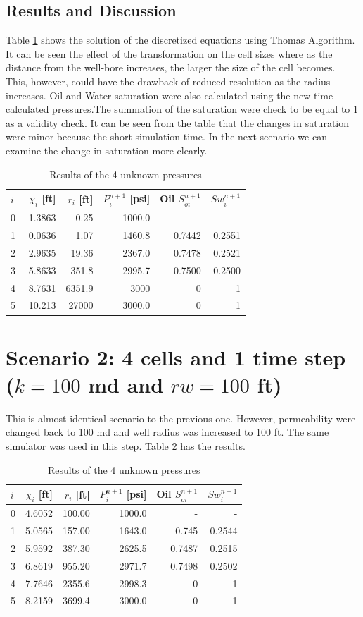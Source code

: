 \documentclass[12pt,letterpaper,titlepage]{article}
\begin{document}
\subsection{Results and Discussion}
Table \ref{tab:1} shows the solution of the discretized equations using Thomas Algorithm. It can be seen the effect of the transformation on the cell sizes where as the distance from the well-bore increases, the larger the size of the cell becomes. This, however, could have the drawback of reduced resolution as the radius increases. Oil and Water saturation were also calculated using the new time calculated pressures.The summation of the saturation were check to be equal to 1 as a validity check. It can be seen from the table that the changes in saturation were minor because the short simulation time. In the next scenario we can examine the change in saturation more clearly. 
\begin{table}[h]
\centering
\begin{tabular}{lrrrrr}
$i$  & $\chi_i$ [ft]& $r_i$ [ft] & $P_i^{n+1}$ [psi] & Oil  $S_{oi}^{n+1}$ & $Sw_i^{n+1}$\\\hline
0 &-1.3863 & 0.25&	1000.0& - & -\\
1& 0.0636 & 1.07&	1460.8&0.7442 &0.2551\\
2& 2.9635 & 19.36&	2367.0&0.7478 &0.2521\\
3 &5.8633 & 351.8&2995.7&0.7500 &0.2500\\
4& 8.7631 & 6351.9&	3000&0 &1\\
5& 10.213 & 27000&	3000.0&0 &1\\
\hline
\end{tabular}
\caption{\label{tab:1}Results of the 4 unknown pressures}
\end{table}
\pagebreak


\section{Scenario 2: 4 cells and 1 time step ($k=100$ md and $rw=100$ ft) }
This is almost identical scenario to the previous one. However, permeability were changed back to 100 md and well radius was increased to 100 ft. The same simulator was used in this step. Table \ref{100} has the results.

\begin{table}[h]
\centering
\begin{tabular}{lrrrrr}
$i$  & $\chi_i$ [ft]& $r_i$ [ft] & $P_i^{n+1}$ [psi] & Oil  $S_{oi}^{n+1}$ & $Sw_i^{n+1}$\\\hline
0 &4.6052 & 100.00&	1000.0& - & -\\
1& 5.0565 & 157.00&	1643.0&0.745 &0.2544\\
2& 5.9592 & 387.30&	2625.5&0.7487 &0.2515\\
3 &6.8619 & 955.20&2971.7&0.7498 &0.2502\\
4& 7.7646 & 2355.6&	2998.3&0 &1\\
5& 8.2159 & 3699.4&	3000.0&0 &1\\
\hline
\end{tabular}
\caption{\label{100}Results of the 4 unknown pressures}
\end{table}
\pagebreak
\end{document}
